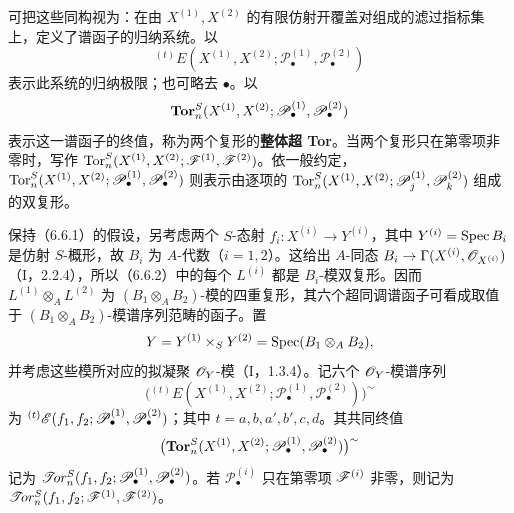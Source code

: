 可把这些同构视为：在由 $X^{(1)},X^{(2)}$ 的有限仿射开覆盖对组成的滤过指标集上，定义了谱函子的归纳系统。以
\[
 {}^{(t)}E(X^{(1)},X^{(2)};\mathscr P^{(1)}_\bullet,\mathscr P^{(2)}_\bullet)
\]
表示此系统的归纳极限；也可略去 $\bullet$。以
\[
 \operatorname{\mathbf{Tor}}^S_n(X^{(1)},X^{(2)};\mathscr P^{(1)}_\bullet,\mathscr P^{(2)}_\bullet)
\]
表示这一谱函子的终值，称为两个复形的\textbf{整体超 Tor}。当两个复形只在第零项非零时，写作
$\operatorname{Tor}^S_n(X^{(1)},X^{(2)};\mathscr F^{(1)},\mathscr F^{(2)})$。依一般约定，
$\operatorname{Tor}^S_n(X^{(1)},X^{(2)};\mathscr P^{(1)}_\bullet,\mathscr P^{(2)}_\bullet)$ 则表示由逐项的 $\operatorname{Tor}^S_n(X^{(1)},X^{(2)};\mathscr P^{(1)}_j,\mathscr P^{(2)}_k)$ 组成的双复形。

保持（6.6.1）的假设，另考虑两个 $S$-态射
$f_i:X^{(i)}\to Y^{(i)}$，其中 $Y^{(i)}=\operatorname{Spec} B_i$ 是仿射 $S$-概形，故 $B_i$ 为 $A$-代数（$i=1,2$）。这给出 $A$-同态
$B_i\to\Gamma(X^{(i)},\mathscr O_{X^{(i)}})$（I，2.2.4），所以（6.6.2）中的每个 $L^{(i)}$ 都是 $B_i$-模双复形。因而 $L^{(1)}\otimes_AL^{(2)}$ 为 $(B_1\otimes_AB_2)$-模的四重复形，其六个超同调谱函子可看成取值于 $(B_1\otimes_AB_2)$-模谱序列范畴的函子。置
\[
 Y=Y^{(1)}\times_SY^{(2)}=\operatorname{Spec}(B_1\otimes_AB_2),
\]
并考虑这些模所对应的拟凝聚 $\mathscr O_Y$-模（I，1.3.4）。记六个 $\mathscr O_Y$-模谱序列
\[
 \bigl({}^{(t)}E(X^{(1)},X^{(2)};
                  \mathscr P^{(1)}_\bullet,\mathscr P^{(2)}_\bullet)\bigr)^\sim
\]
为 ${}^{(t)}\mathscr E(f_1,f_2;\mathscr P^{(1)}_\bullet,\mathscr P^{(2)}_\bullet)$；其中
$t=a,b,a',b',c,d$。其共同终值
\[
 \bigl(\operatorname{\mathbf{Tor}}^S_n(X^{(1)},X^{(2)};
                  \mathscr P^{(1)}_\bullet,\mathscr P^{(2)}_\bullet)\bigr)^\sim
\]
记为 $\mathscr{T}\!or^S_n(f_1,f_2;\mathscr P^{(1)}_\bullet,\mathscr P^{(2)}_\bullet)$。若 $\mathscr P^{(i)}_\bullet$ 只在第零项 $\mathscr F^{(i)}$ 非零，则记为
$\mathscr{T}\!or^S_n(f_1,f_2;\mathscr F^{(1)},\mathscr F^{(2)})$。


